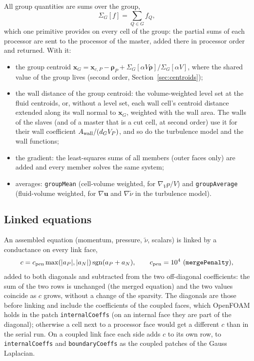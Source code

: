 \documentclass[11pt,a4paper]{article}
\theoremstyle{remark}
\newcommand{\uu}{\bm{u}}
\newcommand{\xx}{\bm{x}}
\newcommand{\Aw}{A_{\rm wall}}
\newcommand{\code}[1]{\texttt{#1}}
\newcommand{\gradV}{\nabla_{\!V}}
\begin{document}
All group quantities are sums over the group,
\begin{equation}
\Sigma_G[f]=\sum_{Q\in G}f_Q ,
\end{equation}
which one primitive provides on every cell of the group: the partial sums of each processor
are sent to the processor of the master, added there in processor order and returned. With it:
\begin{itemize}\itemsep2pt
\item the group centroid
      $\xx_G=\xx_{c,P}-\bm\rho_P+\Sigma_G[\alpha V\bm\rho]/\Sigma_G[\alpha V]$, where the shared value of
      the group lives (second order, Section~\ref{sec:centroids});
\item the wall distance of the group centroid: the volume-weighted level set at the fluid
      centroids, or, without a level set, each wall cell's centroid distance extended along
      its wall normal to $\xx_G$, weighted with the wall area. The walls of the slaves (and of a
      master that is a cut cell, at second order) use it for their wall coefficient
      $\Aw/(d_GV_P)$, and so do the turbulence model and the wall functions;
\item the gradient: the least-squares sums of all members (outer faces only) are added and
      every member solves the same system;
\item averages: \code{groupMean} (cell-volume weighted, for $\gradV p/V$) and
      \code{groupAverage} (fluid-volume weighted, for $\nabla\uu$ and $\nabla\tilde\nu$ in the
      turbulence model).
\end{itemize}

\subsection{Linked equations}

An assembled equation (momentum, pressure, $\tilde\nu$, scalars) is linked by a conductance on
every link face,
\begin{equation}
c=c_{\rm pen}\max(|a_P|,|a_N|)\,{\rm sgn}(a_P+a_N),\qquad c_{\rm pen}=10^4
\ (\code{mergePenalty}),
\end{equation}
added to both diagonals and subtracted from the two off-diagonal coefficients: the sum of the
two rows is unchanged (the merged equation) and the two values coincide as $c$ grows, without a
change of the sparsity. The diagonals are those before linking and include the coefficients of
the coupled faces, which OpenFOAM holds in the patch \code{internalCoeffs} (on an internal face
they are part of the diagonal); otherwise a cell next to a processor face would get a different
$c$ than in the serial run. On a coupled link face each side adds $c$ to its own row, to
\code{internalCoeffs} and \code{boundaryCoeffs} as the coupled patches of the Gauss Laplacian.
\end{document}
